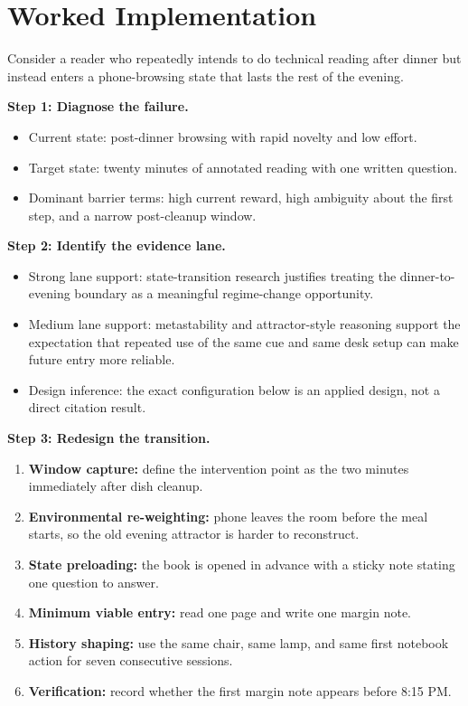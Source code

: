 \section{Worked Implementation}

\begin{example}
Consider a reader who repeatedly intends to do technical reading after dinner
but instead enters a phone-browsing state that lasts the rest of the evening.

\textbf{Step 1: Diagnose the failure.}
\begin{itemize}[nosep]
  \item Current state: post-dinner browsing with rapid novelty and low effort.
  \item Target state: twenty minutes of annotated reading with one written
        question.
  \item Dominant barrier terms: high current reward, high ambiguity about the
        first step, and a narrow post-cleanup window.
\end{itemize}

\textbf{Step 2: Identify the evidence lane.}
\begin{itemize}[nosep]
  \item Strong lane support: state-transition research justifies treating the
        dinner-to-evening boundary as a meaningful regime-change opportunity.
  \item Medium lane support: metastability and attractor-style reasoning
        support the expectation that repeated use of the same cue and same desk
        setup can make future entry more reliable.
  \item Design inference: the exact configuration below is an applied design,
        not a direct citation result.
\end{itemize}

\textbf{Step 3: Redesign the transition.}
\begin{enumerate}[nosep]
  \item \textbf{Window capture:} define the intervention point as the two
        minutes immediately after dish cleanup.
  \item \textbf{Environmental re-weighting:} phone leaves the room before the
        meal starts, so the old evening attractor is harder to reconstruct.
  \item \textbf{State preloading:} the book is opened in advance with a sticky
        note stating one question to answer.
  \item \textbf{Minimum viable entry:} read one page and write one margin note.
  \item \textbf{History shaping:} use the same chair, same lamp, and same first
        notebook action for seven consecutive sessions.
  \item \textbf{Verification:} record whether the first margin note appears
        before 8:15 PM.
\end{enumerate}


\end{example}
